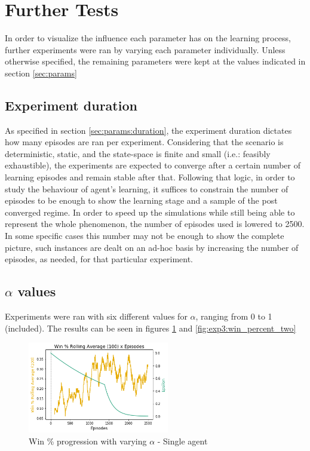 \documentclass[11pt]{article}
\begin{document}
\section{Further Tests}
    In order to visualize the influence each parameter has on the learning process, further experiments were ran by varying each parameter individually. Unless otherwise specified, the remaining parameters were kept at the values indicated in section \ref{sec:params}

    \subsection{Experiment duration}
        As specified in section \ref{sec:params:duration}, the experiment duration dictates how many episodes are ran per experiment. Considering that the scenario is deterministic, static, and the state-space is finite and small (i.e.: feasibly exhaustible), the experiments are expected to converge after a certain number of learning episodes and remain stable after that. Following that logic, in order to study the behaviour of agent's learning, it suffices to constrain the number of episodes to be enough to show the learning stage and a sample of the post converged regime. In order to speed up the simulations while still being able to represent the whole phenomenon, the number of episodes used is lowered to 2500. In some specific cases this number may not be enough to show the complete picture, such instances are dealt on an ad-hoc basis by increasing the number of episodes, as needed, for that particular experiment.

    \subsection{$\alpha$ values}
        Experiments were ran with six different values for $\alpha$, ranging from 0 to 1 (included). The results can be seen in figures \ref{fig:exp3:win_percent} and \ref{fig:exp3:win_percent_two}
        \begin{figure}[h]
            \includegraphics[height=4cm]{Images/exp_3/1_win_percent.png}
            \caption{Win \% progression with varying $\alpha$ - Single agent}
            \label{fig:exp3:win_percent}
        \end{figure}
\end{document}
